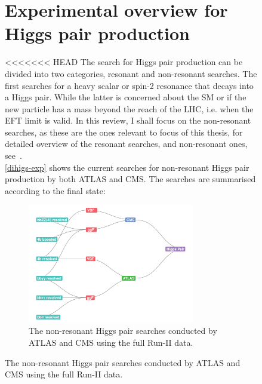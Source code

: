\begin{figure}[!htpb]
\section{Experimental overview for Higgs pair production \label{exphh}  }
<<<<<<< HEAD
The search for Higgs pair production can be divided into two categories, resonant and non-resonant searches. The first searches for a heavy scalar or spin-2 resonance that decays into a Higgs pair. While the latter is concerned about the SM or if the new particle has a mass beyond the reach of the LHC, i.e. when the EFT limit is valid. In this review, I shall focus on the non-resonant searches, as these are the ones relevant to focus of this thesis, for detailed overview of the resonant searches, and non-resonant ones, see~\cite{DiMicco:2019ngk}.\\
%
\autoref{dihigs-exp} shows the current searches for non-resonant Higgs pair production by both ATLAS and CMS. The searches are summarised according to the final state:
\begin{figure}[!htpb]
	\centering
	\includegraphics[width = 0.8\textwidth]{./figures/HH-exp-network}
	\caption{The non-resonant Higgs pair searches conducted by ATLAS and CMS using the full Run-II data.} 
	\label{dihigs-exp}
\end{figure}

\end{figure}
